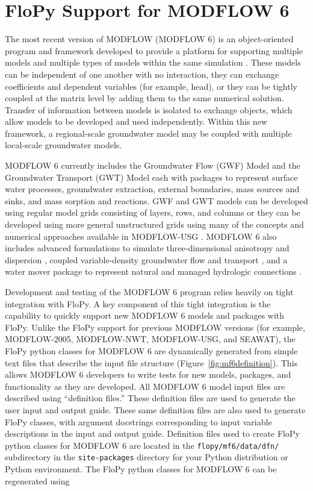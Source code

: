\documentclass[11pt, oneside]{article}  	%
\begin{document}
\section{FloPy Support for MODFLOW 6}

The most recent version of MODFLOW (MODFLOW 6) is an object-oriented program and framework developed to provide a platform for supporting multiple models and multiple types of models within the same simulation \citep{modflow6gwf, modflow6framework, morway2021use}. These models can be independent of one another with no interaction, they can exchange coefficients and dependent variables (for example, head), or they can be tightly coupled at the matrix level by adding them to the same numerical solution. Transfer of information between models is isolated to exchange objects, which allow models to be developed and used independently. Within this new framework, a regional-scale groundwater model may be coupled with multiple local-scale groundwater models. 

MODFLOW 6 currently includes the Groundwater Flow (GWF) Model and the Groundwater Transport (GWT) Model each with packages to represent surface water processes, groundwater extraction, external boundaries, mass sources and sinks, and mass sorption and reactions. GWF and GWT models can be developed using regular model grids consisting of layers, rows, and columns or they can be developed using more general unstructured grids using many of the concepts and numerical approaches available in MODFLOW-USG \citep{modflowusg}. MODFLOW 6 also includes advanced formulations to simulate three-dimensional anisotropy and dispersion \citep{modflow6xt3d}, coupled variable-density groundwater flow and transport \citep{langevin2020hydraulic}, and a water mover package to represent natural and managed hydrologic connections \citep{morway2021use}.

Development and testing of the MODFLOW 6 program relies heavily on tight integration with FloPy. A key component of this tight integration is the capability to quickly support new MODFLOW 6 models and packages with FloPy. Unlike the FloPy support for previous MODFLOW versions (for example, MODFLOW-2005, MODFLOW-NWT, MODFLOW-USG, and SEAWAT), the FloPy python classes for MODFLOW 6 are dynamically generated from simple text files that describe the input file structure (Figure~\ref{fig:mf6definition}). This allows MODFLOW 6 developers to write tests for new models, packages, and functionality as they are developed. All MODFLOW 6 model input files are described using ``definition files.'' These definition files are used to generate the user input and output guide. These same definition files are also used to generate FloPy classes, with argument docstrings corresponding to input variable descriptions in the input and output guide. Definition files used to create FloPy python classes for MODFLOW 6 are located in the \texttt{flopy/mf6/data/dfn/} subdirectory in the \texttt{site-packages} directory for your Python distribution or Python environment. The FloPy python classes for MODFLOW 6 can be regenerated using 
\end{document}

